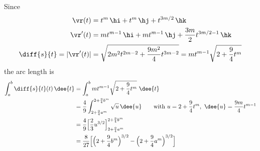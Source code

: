 \begin{solution} 
Since
\begin{align*}
\vr(t) & = t^m\,\hi + t^m\,\hj + t^{3m/2}\,\hk \\
\vr'(t) &= mt^{m-1}\,\hi + mt^{m-1}\,\hj +\frac{3m}{2}t^{3m/2-1}\,\hk \\
\diff{s}{t} = |\vr'(t)| & = \sqrt{ 2m^2 t^{2m-2} +\frac{9m^2}{4} t^{3m-2} } 
= mt^{m-1}\sqrt{2 + \frac{9}{4}t^m }
\end{align*}
the arc length is
\begin{align*}
\int_a^b \diff{s}{t}(t)\,\dee{t}
&=\int_a^b mt^{m-1}\sqrt{2 + \frac{9}{4}t^m }\ \dee{t} \\
&=\frac{4}{9}\int_{2 + \frac{9}{4}a^m}^{2 + \frac{9}{4}b^m}\sqrt{u}\,\dee{u}
\qquad\text{with } u = 2 + \frac{9}{4}t^m,\ \dee{u} = \frac{9m}{4}t^{m-1}\\
&=\frac{4}{9}\Big[\frac{2}{3}u^{3/2}\Big]_{2 + \frac{9}{4}a^m}
                                         ^{2 + \frac{9}{4}b^m} \\
&=\frac{8}{27}\Big[\Big(2 + \frac{9}{4}b^m\Big)^{3/2}
                   -\Big(2 + \frac{9}{4}a^m\Big)^{3/2}\Big]
\end{align*} 
\end{solution}




